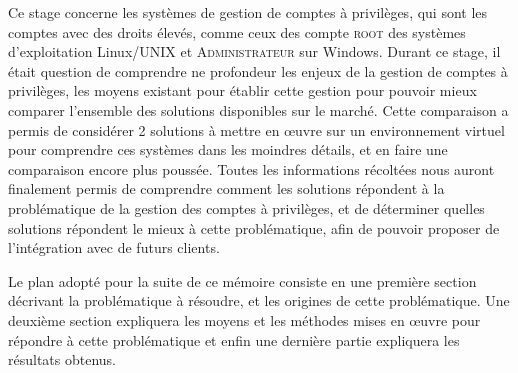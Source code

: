Ce stage concerne les systèmes de gestion de comptes à privilèges, qui sont les comptes avec des droits élevés, comme ceux des compte \textsc{root} des systèmes d'exploitation Linux/UNIX et \textsc{Administrateur} sur Windows. Durant ce stage, il était question de comprendre ne profondeur les enjeux de la gestion de comptes à privilèges, les moyens existant pour établir cette gestion pour pouvoir mieux comparer l'ensemble des solutions disponibles sur le marché. Cette comparaison a permis de considérer 2 solutions à mettre en œuvre sur un environnement virtuel pour comprendre ces systèmes dans les moindres détails, et en faire une comparaison encore plus poussée. Toutes les informations récoltées nous auront finalement permis de comprendre comment les solutions répondent à la problématique de la gestion des comptes à privilèges, et de déterminer quelles solutions répondent le mieux à cette problématique, afin de pouvoir proposer de l'intégration avec de futurs clients.

Le plan adopté pour la suite de ce mémoire consiste en une première section décrivant la problématique à résoudre, et les origines de cette problématique. Une deuxième section expliquera les moyens et les méthodes mises en œuvre pour répondre à cette problématique et enfin une dernière partie expliquera les résultats obtenus.